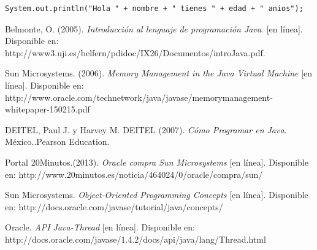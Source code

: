 \documentclass[12pt]{book} %
\begin{document}
\begin{lstlisting}[]
	System.out.println("Hola " + nombre + " tienes " + edad + " anios");
\end{lstlisting}
		
	
\begin{thebibliography}{99}
 Belmonte, O. (2005). \textsl{Introducción al lenguaje de programación Java}. [en línea]. Disponible en: http://www3.uji.es/belfern/pdidoc/IX26/Documentos/introJava.pdf.

 Sun Microsystems. (2006). \textsl{Memory Management in the Java Virtual Machine} [en línea]. Disponible en: http://www.oracle.com/technetwork/java/javase/memorymanagement-whitepaper-150215.pdf

 DEITEL, Paul J. y Harvey M. DEITEL (2007). \textsl{Cómo Programar en Java}. México..Pearson Education. 

 Portal 20Minutos.(2013). \textsl{Oracle compra Sun Microsystems} [en línea]. Disponible en: http://www.20minutos.es/noticia/464024/0/oracle/compra/sun/

 Sun Microsystems. \textsl{Object-Oriented Programming Concepts} [en línea]. Disponible en: http://docs.oracle.com/javase/tutorial/java/concepts/

 Oracle. \textsl{API Java-Thread} [en línea]. Disponible en: http://docs.oracle.com/javase/1.4.2/docs/api/java/lang/Thread.html

\end{thebibliography}
\end{document}
